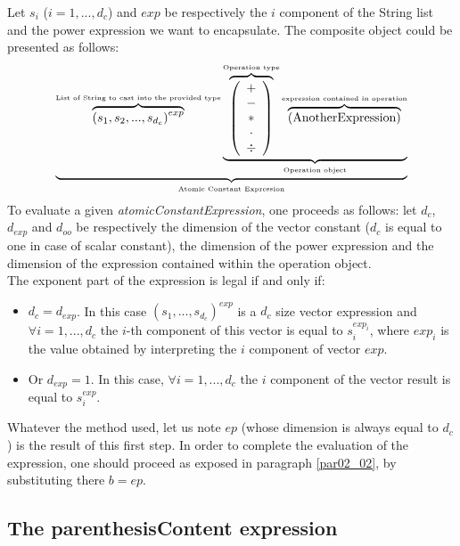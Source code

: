 \documentclass[a4paper,11pt] {ivoa}
\begin{document}
Let $s_i$ ($i=1,...,d_c$) and $exp$ be respectively the $i$ component of the String list and the
power expression we want to encapsulate. The composite object could be presented as follows:
\begin{equation}
 \underbrace{    \overbrace{ \left( s_1  , s_2, ..., s_{d_c}\right)^{exp} }^{\mbox{\tiny List of String  to cast into the provided type}}   \underbrace{  \overbrace{\left( \begin{array}{c} + \\ - \\ \ast  \\ \cdot \\ \div   \end{array} \right) }^{\mbox{\tiny Operation type}}
 \overbrace{    \left( \mbox{AnotherExpression}\right) }^{\mbox{\tiny expression contained in operation}}   }_{\mbox{\tiny Operation object}}}_{\mbox{\tiny Atomic Constant Expression}}
\end{equation}
To evaluate a given {\it atomicConstantExpression}, one proceeds as follows: let $d_c$, $d_{exp}$
and $d_{oo}$ be respectively the dimension of the vector constant ($d_c$ is equal to one in case of scalar constant),
the dimension of the power expression and the dimension of the expression contained within the operation object.\\
The exponent part of the expression is legal if and only if:
\begin{itemize}
\item $d_c = d_{exp}$. In this case $(s_1,...,s_{d_c})^{exp}$ is a $d_c$ size vector expression and
$\forall i =1,...,d_c$ the $i$-th component of this vector is equal to $s_i^{exp_i}$, where $exp_i$
is the value obtained by interpreting the $i$ component of vector $exp$.
\item Or $d_{exp}=1$. In this case, $\forall i =1,...,d_c$ the $i$ component of the vector result is
equal to $s_i^{exp}$.\\
\end{itemize}
Whatever the method used, let us note $ep$ (whose dimension is always equal to $d_c$)  is the result
of this first step.  In order to complete the evaluation of the expression, one should proceed as
exposed in paragraph \ref{par02_02}, by substituting there $b=ep$.


\subsection{The parenthesisContent expression}\label{par02_04}
\end{document}
